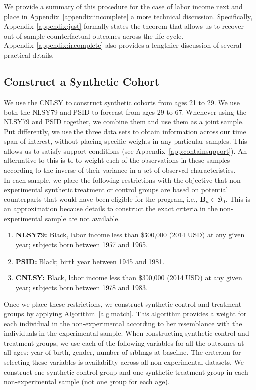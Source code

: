 \noindent We provide a summary of this procedure for the case of labor income next and place in Appendix~\ref{appendix:incomplete} a more technical discussion. Specifically, Appendix~\ref{appendix:just} formally states the theorem that allows us to recover out-of-sample counterfactual outcomes across the life cycle. Appendix~\ref{appendix:incomplete} also provides a lengthier discussion of several practical details.

\subsection{Construct a Synthetic Cohort}

We use the CNLSY to construct synthetic cohorts from ages 21 to 29. We use both the NLSY79 and PSID to forecast from ages 29 to 67. Whenever using the NLSY79 and PSID together, we combine them and use them as a joint sample. Put differently, we use the three data sets to obtain information across our time span of interest, without placing specific weights in any particular samples. This allows us to satisfy support conditions (see Appendix~\ref{app:containsupport}). An alternative to this is to to weight each of the observations in these samples according to the inverse of their variance in a set of observed characteristics.\\

\noindent In each sample, we place the following restrictions with the objective that non-experimental synthetic treatment or control groups are based on potential counterparts that would have been eligible for the program, i.e., $\bm{B}_{n} \in \mathcal{B}_0$. This is an approximation because details to construct the exact criteria in the non-experimental sample are not available.

\begin{enumerate}
\item \textbf{NLSY79:} Black, labor income less than \$300,000 (2014 USD) at any given year; subjects born between 1957 and 1965.
\item \textbf{PSID:} Black; birth year between 1945 and 1981.
\item \textbf{CNLSY:} Black, labor income less than \$300,000 (2014 USD) at any given year; subjects born between 1978 and 1983.
\end{enumerate}

\noindent Once we place these restrictions, we construct synthetic control and treatment groups by applying Algorithm~\ref{alg:match}. This algorithm provides a weight for each individual in the non-experimental according to her resemblance with the individuals in the experimental sample. When constructing synthetic control and treatment groups, we use each of the following variables for all the outcomes at all ages: year of birth, gender, number of siblings at baseline. The criterion for selecting these variables is availability across all non-experimental datasets. We construct one synthetic control group and one synthetic treatment group in each non-experimental sample (not one group for each age).\\

